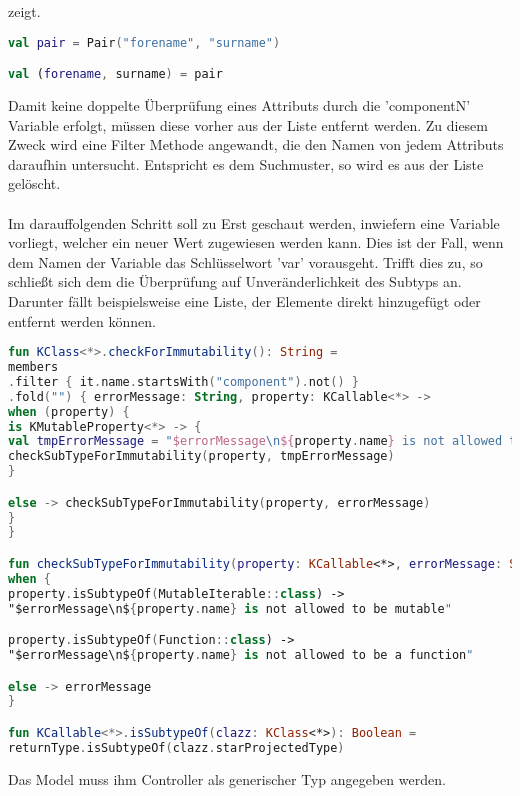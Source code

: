 zeigt.
\begin{lstlisting}[caption={Destrukturierende Zuweisung}, label={lst:destrukturierende-zuweisung}, language=Kotlin]
val pair = Pair("forename", "surname")

val (forename, surname) = pair
\end{lstlisting}
Damit keine doppelte Überprüfung eines Attributs durch die 'componentN' Variable erfolgt, müssen diese vorher aus der Liste entfernt werden. Zu diesem Zweck wird eine Filter Methode angewandt, die den Namen von jedem Attributs daraufhin untersucht. Entspricht es dem Suchmuster, so wird es aus der Liste gelöscht.
\\
\\
Im darauffolgenden Schritt soll zu Erst geschaut werden, inwiefern eine Variable vorliegt, welcher ein neuer Wert zugewiesen werden kann. Dies ist der Fall, wenn dem Namen der Variable das Schlüsselwort 'var' vorausgeht. Trifft dies zu, so schließt sich dem die Überprüfung auf Unveränderlichkeit des Subtyps an. Darunter fällt beispielsweise eine Liste, der Elemente direkt hinzugefügt oder entfernt werden können.
\begin{lstlisting}[caption={}, label={lst:data-class}, language=Kotlin]
fun KClass<*>.checkForImmutability(): String =
members
.filter { it.name.startsWith("component").not() }
.fold("") { errorMessage: String, property: KCallable<*> ->
when (property) {
is KMutableProperty<*> -> {
val tmpErrorMessage = "$errorMessage\n${property.name} is not allowed to be 'var'"
checkSubTypeForImmutability(property, tmpErrorMessage)
}

else -> checkSubTypeForImmutability(property, errorMessage)
}
}

fun checkSubTypeForImmutability(property: KCallable<*>, errorMessage: String) =
when {
property.isSubtypeOf(MutableIterable::class) ->
"$errorMessage\n${property.name} is not allowed to be mutable"

property.isSubtypeOf(Function::class) ->
"$errorMessage\n${property.name} is not allowed to be a function"

else -> errorMessage
}

fun KCallable<*>.isSubtypeOf(clazz: KClass<*>): Boolean =
returnType.isSubtypeOf(clazz.starProjectedType)
\end{lstlisting}
\bigskip
Das Model muss ihm Controller als generischer Typ angegeben werden.

